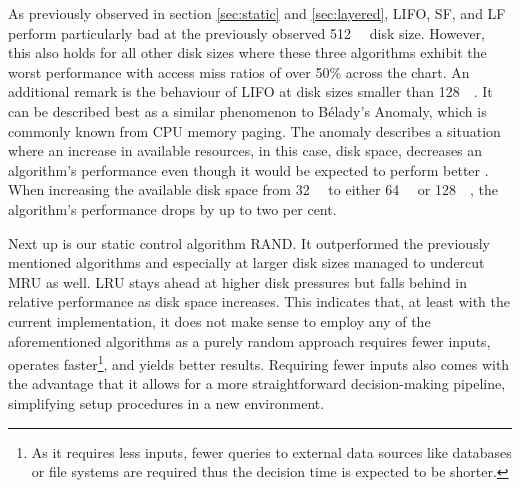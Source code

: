         
        As previously observed in section \ref{sec:static} and \ref{sec:layered}, LIFO, SF, and LF perform particularly bad at the previously observed \SI{512}{\giga\byte} disk size. However, this also holds for all other disk sizes where these three algorithms exhibit the worst performance with access miss ratios of over 50\% across the chart. An additional remark is the behaviour of LIFO at disk sizes smaller than \SI{128}{\giga\byte}. It can be described best as a similar phenomenon to Bélady's Anomaly, which is commonly known from CPU memory paging. The anomaly describes a situation where an increase in available resources, in this case, disk space, decreases an algorithm's performance even though it would be expected to perform better \cite{belady-anomaly}. When increasing the available disk space from \SI{32}{\giga\byte} to either \SI{64}{\giga\byte} or \SI{128}{\giga\byte}, the algorithm's performance drops by up to two per cent.
        
        Next up is our static control algorithm RAND. It outperformed the previously mentioned algorithms and especially at larger disk sizes managed to undercut MRU as well. LRU stays ahead at higher disk pressures but falls behind in relative performance as disk space increases. This indicates that, at least with the current implementation, it does not make sense to employ any of the aforementioned algorithms as a purely random approach requires fewer inputs, operates faster\footnote{As it requires less inputs, fewer queries to external data sources like databases or file systems are required thus the decision time is expected to be shorter.}, and yields better results. Requiring fewer inputs also comes with the advantage that it allows for a more straightforward decision-making pipeline, simplifying setup procedures in a new environment.
        
